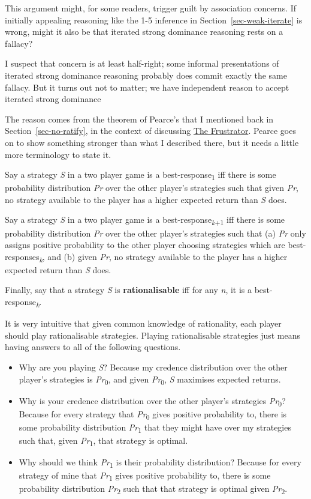 \documentclass[
  12pt,
  letterpaper,
  DIV=11,
  numbers=noendperiod]{scrreprt}
\providecommand{\tightlist}{%
  \setlength{\itemsep}{0pt}\setlength{\parskip}{0pt}}\usepackage{longtable,booktabs,array}
\begin{document}
This argument might, for some readers, trigger guilt by association
concerns. If initially appealing reasoning like the 1-5 inference in
Section~\ref{sec-weak-iterate} is wrong, might it also be that iterated
strong dominance reasoning rests on a fallacy?

I suspect that concern is at least half-right; some informal
presentations of iterated strong dominance reasoning probably does
commit exactly the same fallacy. But it turns out not to matter; we have
independent reason to accept iterated strong dominance

The reason comes from the theorem of Pearce's that I mentioned back in
Section~\ref{sec-no-ratify}, in the context of discussing
\protect\hyperlink{tbl-frustrator}{The Frustrator}. Pearce goes on to
show something stronger than what I described there, but it needs a
little more terminology to state it.

Say a strategy \emph{S} in a two player game is a
best-response\textsubscript{1} iff there is some probability
distribution \emph{Pr} over the other player's strategies such that
given \emph{Pr}, no strategy available to the player has a higher
expected return than \emph{S} does.

Say a strategy \emph{S} in a two player game is a
best-response\textsubscript{\emph{k}+1} iff there is some probability
distribution \emph{Pr} over the other player's strategies such that (a)
\emph{Pr} only assigns positive probability to the other player choosing
strategies which are best-responses\textsubscript{\emph{k}}, and (b)
given \emph{Pr}, no strategy available to the player has a higher
expected return than \emph{S} does.

Finally, say that a strategy \emph{S} is \textbf{rationalisable} iff for
any \emph{n}, it is a best-response\textsubscript{\emph{k}}.

It is very intuitive that given common knowledge of rationality, each
player should play rationalisable strategies. Playing rationalisable
strategies just means having answers to all of the following questions.

\begin{itemize}
\tightlist
\item
  Why are you playing \emph{S}? Because my credence distribution over
  the other player's strategies is \emph{Pr}\textsubscript{0}, and given
  \emph{Pr}\textsubscript{0}, \emph{S} maximises expected returns.
\item
  Why is your credence distribution over the other player's strategies
  \emph{Pr}\textsubscript{0}? Because for every strategy that
  \emph{Pr}\textsubscript{0} gives positive probability to, there is
  some probability distribution \emph{Pr}\textsubscript{1} that they
  might have over my strategies such that, given
  \emph{Pr}\textsubscript{1}, that strategy is optimal.
\item
  Why should we think \emph{Pr}\textsubscript{1} is their probability
  distribution? Because for every strategy of mine that
  \emph{Pr}\textsubscript{1} gives positive probability to, there is
  some probability distribution \emph{Pr}\textsubscript{2} such that
  that strategy is optimal given \emph{Pr}\textsubscript{2}.
\end{itemize}
\end{document}
